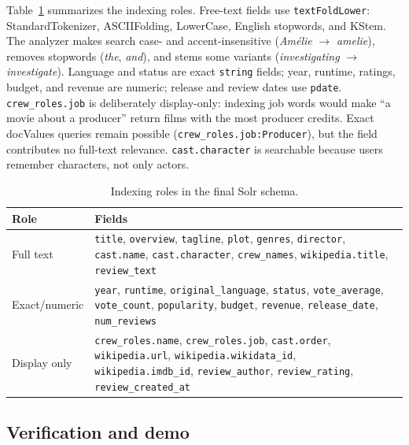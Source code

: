 \documentclass[sigconf]{acmart}
\begin{document}
Table~\ref{tab:index-fields} summarizes the indexing roles. Free-text fields use
\texttt{textFoldLower}: StandardTokenizer, ASCIIFolding, LowerCase, English
stopwords, and KStem. The analyzer makes search case- and accent-insensitive
(\textit{Amélie} $\rightarrow$ \textit{amelie}), removes stopwords
(\textit{the}, \textit{and}), and stems some variants
(\textit{investigating} $\rightarrow$ \textit{investigate}). Language and status
are exact \texttt{string} fields; year, runtime, ratings, budget, and revenue are
numeric; release and review dates use \texttt{pdate}. \texttt{crew\_roles.job} is
deliberately display-only: indexing job words would make ``a movie about a
producer'' return films with the most producer credits. Exact docValues queries
remain possible (\texttt{crew\_roles.job:Producer}), but the field contributes no
full-text relevance. \texttt{cast.character} is searchable because users remember
characters, not only actors.


\begin{table}[t]
\centering
\setlength{\tabcolsep}{4pt}
\caption{Indexing roles in the final Solr schema.}
\label{tab:index-fields}
\footnotesize
\begin{tabular}{p{1.9cm}p{5.0cm}}
\hline
Role & Fields \\
\hline
Full text & \texttt{title}, \texttt{overview}, \texttt{tagline}, \texttt{plot},
\texttt{genres}, \texttt{director}, \texttt{cast.name},
\texttt{cast.character}, \texttt{crew\_names}, \texttt{wikipedia.title},
\texttt{review\_text} \\
Exact/numeric & \texttt{year}, \texttt{runtime},
\texttt{original\_language}, \texttt{status}, \texttt{vote\_average},
\texttt{vote\_count}, \texttt{popularity}, \texttt{budget}, \texttt{revenue},
\texttt{release\_date}, \texttt{num\_reviews} \\
Display only & \texttt{crew\_roles.name}, \texttt{crew\_roles.job},
\texttt{cast.order}, \texttt{wikipedia.url}, \texttt{wikipedia.wikidata\_id},
\texttt{wikipedia.imdb\_id}, \texttt{review\_author}, \texttt{review\_rating},
\texttt{review\_created\_at} \\
\hline
\end{tabular}
\end{table}

\subsection{Verification and demo}
\label{sec:verification-demo}
\end{document}
